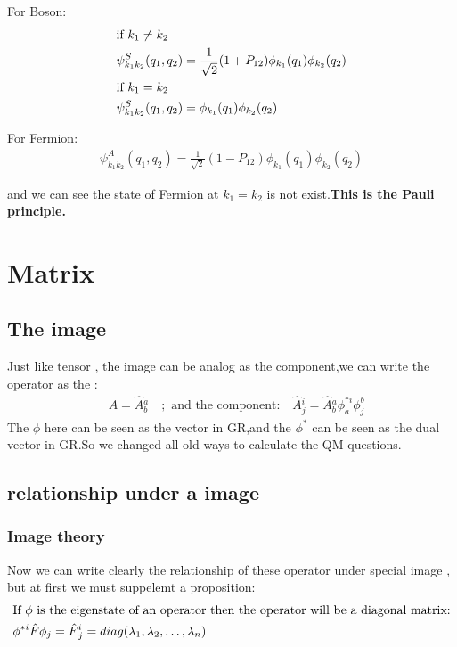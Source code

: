 \documentclass{article}
\begin{document}
For Boson:
\begin{align}
  &\text{if $k_1\ne k_2$} \notag \\
 & \psi^S_{k_1k_2}(q_1,q_2)=\frac1{\sqrt2}(1+P_{12})\phi_{k_1}(q_1)\phi_{k_2}(q_2) \\
 &\text{if $k_1=k_2$}\notag \\
 &\psi^S_{k_1k_2}(q_1,q_2)=\phi_{k_1}(q_1)\phi_{k_2}(q_2) 
\end{align}

For Fermion:
\begin{align}
  \psi^A_{k_1k_2}(q_1,q_2)=\frac1{\sqrt2}(1-P_{12})\phi_{k_1}(q_1)\phi_{k_2}(q_2)
\end{align}

and we can see the state of Fermion at $k_1=k_2$ is not exist.\textbf{This is the Pauli principle.}

\section{Matrix}
\subsection{The image}
Just like tensor , the image can be analog as the component,we can write the operator as the :\begin{align}
  &A=\hat A{^a_b}\quad;\text{ and the component:}\quad \hat A{^i_j}=\hat A{^a_b}\phi^{*i}_a\phi_j^b
\end{align}
The $\phi$ here can be seen as the vector in GR,and the $\phi^*$ can be seen as the dual vector in GR.So we changed all old ways to calculate the QM questions.
\subsection{relationship under a image}
\subsubsection{Image theory}
Now we can write clearly the relationship of these operator under special image , but at first we must suppelemt a proposition:
\begin{align}
&\text{If $\phi$ is the eigenstate of an operator then the operator will be a diagonal matrix:}\notag\\
&\phi^{*i}\hat F\phi_j=\hat F{^i_j}=diag(\lambda_1,\lambda_2,\dots,\lambda_n)
\end{align}
\end{document}
